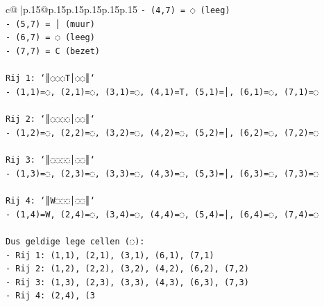 \documentclass{article}
\begin{document}
{\begin{supertabular}{c@{$\;$}|p{.15\linewidth}@{}p{.15\linewidth}p{.15\linewidth}p{.15\linewidth}p{.15\linewidth}p{.15\linewidth}}
{{{\texttt{{-} (4,7) = ◌ (leeg)} \\
\texttt{{-} (5,7) = │ (muur)} \\
\texttt{{-} (6,7) = ◌ (leeg)} \\
\texttt{{-} (7,7) = C (bezet)} \\
\\ 
\texttt{Rij 1: `║◌◌◌T│◌◌║`} \\
\texttt{{-} (1,1)=◌, (2,1)=◌, (3,1)=◌, (4,1)=T, (5,1)=│, (6,1)=◌, (7,1)=◌} \\
\\ 
\texttt{Rij 2: `║◌◌◌◌│◌◌║`} \\
\texttt{{-} (1,2)=◌, (2,2)=◌, (3,2)=◌, (4,2)=◌, (5,2)=│, (6,2)=◌, (7,2)=◌} \\
\\ 
\texttt{Rij 3: `║◌◌◌◌│◌◌║`} \\
\texttt{{-} (1,3)=◌, (2,3)=◌, (3,3)=◌, (4,3)=◌, (5,3)=│, (6,3)=◌, (7,3)=◌} \\
\\ 
\texttt{Rij 4: `║W◌◌◌│◌◌║`} \\
\texttt{{-} (1,4)=W, (2,4)=◌, (3,4)=◌, (4,4)=◌, (5,4)=│, (6,4)=◌, (7,4)=◌} \\
\\ 
\texttt{Dus geldige lege cellen (◌):} \\
\texttt{{-} Rij 1: (1,1), (2,1), (3,1), (6,1), (7,1)} \\
\texttt{{-} Rij 2: (1,2), (2,2), (3,2), (4,2), (6,2), (7,2)} \\
\texttt{{-} Rij 3: (1,3), (2,3), (3,3), (4,3), (6,3), (7,3)} \\
\texttt{{-} Rij 4: (2,4), (3} \\
            }
        }
    }
     \\ \\


\end{supertabular}}
\end{document}
